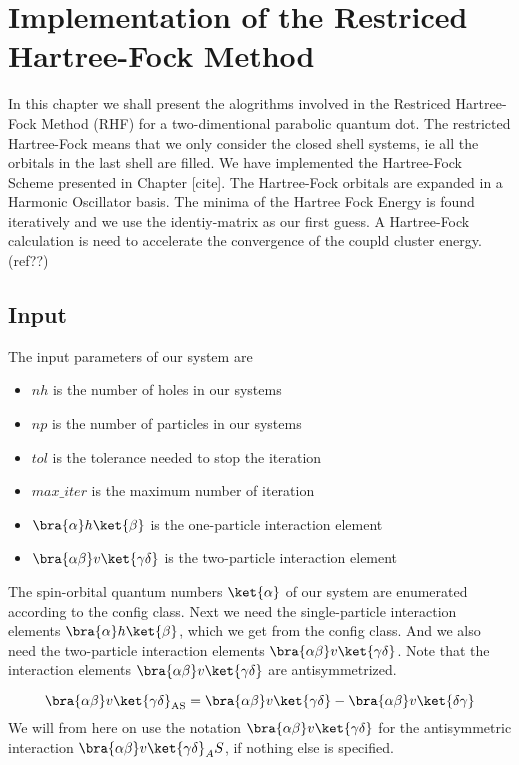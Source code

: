  \section{Implementation of the Restriced Hartree-Fock Method}
In this chapter we shall present the alogrithms involved in the Restriced Hartree-Fock Method (RHF) for a two-dimentional parabolic quantum dot. The restricted Hartree-Fock means that we only consider the closed shell systems, ie all the orbitals in the last shell are filled. We have implemented the Hartree-Fock Scheme presented in Chapter [cite]. The Hartree-Fock orbitals are expanded in a Harmonic Oscillator basis. The minima of the Hartree Fock Energy is found iteratively and we use the identiy-matrix as our first guess. A Hartree-Fock calculation is need to accelerate the convergence of the coupld cluster energy. (ref??)
\\
\subsection{Input}
The input parameters of our system are
\begin{itemize}
  \item $nh$ is the number of holes in our systems
  \item $np$ is the number of particles in our systems
  \item $tol$ is the tolerance needed to stop the iteration
  \item $max\_iter$ is the maximum number of iteration
  \item $\bra{\alpha}h\ket{\beta}$ is the one-particle interaction element
  \item $\bra{\alpha\beta}v\ket{\gamma \delta}$ is the two-particle interaction element
\end{itemize}
%
The spin-orbital quantum numbers $\ket{\alpha}$ of our system are enumerated according to the config class. Next we need the single-particle interaction  elements $\bra{\alpha}h\ket{\beta}$, which we get from the config class. And we also need the two-particle interaction elements $\bra{\alpha\beta}v\ket{\gamma\delta}$. Note that the interaction elements $\bra{\alpha\beta}v\ket{\gamma\delta}$ are antisymmetrized.

\begin{equation}
\bra{\alpha \beta} v \ket{\gamma \delta}_{\text{AS}} = \bra{\alpha \beta}v\ket{\gamma \delta} - \bra{\alpha \beta}v\ket{\delta \gamma} 
  \label{antisymmetrized elements}
\end{equation}
%
We will from here on use the notation $\bra{\alpha \beta}v\ket{\gamma \delta}$ for the antisymmetric interaction $\bra{\alpha \beta}v\ket{\gamma \delta}_AS$, if nothing else is specified.


